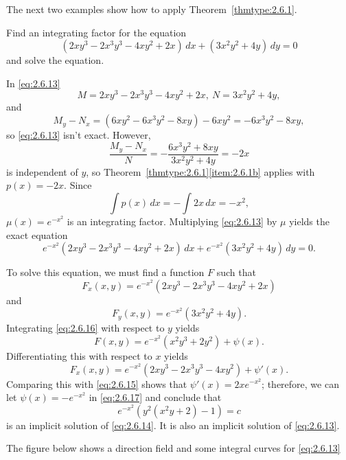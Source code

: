 \documentclass{ximera}
\begin{document}
The next two examples show how to apply
Theorem~\ref{thmtype:2.6.1}.

\begin{example}\label{example:2.6.1}
Find an integrating factor for the equation
\begin{equation}\label{eq:2.6.13}
(2xy^3-2x^3y^3-4xy^2+2x)\,dx+(3x^2y^2+4y)\,dy=0
\end{equation}
and solve the equation.
\begin{explanation}
In \eqref{eq:2.6.13}
$$
M=2xy^3-2x^3y^3-4xy^2+2x,\ N=3x^2y^2+4y,
$$
and
$$
M_y-N_x=(6xy^2-6x^3y^2-8xy)-6xy^2=-6x^3y^2-8xy,
$$
so \eqref{eq:2.6.13}  isn't  exact. However,
$$
\frac{M_y-N_x}{N}=-\frac{6x^3y^2+8xy}{3x^2y^2+4y}=-2x
$$
is independent of $y$, so Theorem~\ref{thmtype:2.6.1}\ref{item:2.6.1b} applies
with
$p(x)=-2x$. Since
$$
\int p (x)\,dx=-\int 2x\,dx=-x^2,
$$
 $\mu(x)=e^{-x^2}$ is an
integrating factor.  Multiplying \eqref{eq:2.6.13} by $\mu$ yields the
exact equation
\begin{equation}\label{eq:2.6.14}
e^{-x^2}(2xy^3-2x^3y^3-4xy^2+2x)\,dx+
 e^{-x^2}(3x^2y^2+4y)\,dy=0.
\end{equation}

To solve this equation, we must find a
function $F$ such that
\begin{equation}\label{eq:2.6.15}
F_x(x,y)=e^{-x^2}(2xy^3-2x^3y^3-4xy^2+2x)
\end{equation}
 and
\begin{equation}\label{eq:2.6.16}
F_y(x,y)=e^{-x^2}(3x^2y^2+4y).
\end{equation}
 Integrating \eqref{eq:2.6.16} with respect to $y$ yields
\begin{equation}\label{eq:2.6.17}
F(x,y)=e^{-x^2}(x^2y^3+2y^2)+\psi(x).
\end{equation}
 Differentiating this with respect to $x$ yields
$$
F_x(x,y)=e^{-x^2}(2xy^3-2x^3y^3-4xy^2)+\psi'(x).
$$
Comparing this with \eqref{eq:2.6.15} shows that $\psi'(x)=
2xe^{-x^2}$;  therefore, we can let $\psi(x)=-e^{-x^2}$ in
\eqref{eq:2.6.17} and conclude that
$$
e^{-x^2}\left(y^2(x^2y+2)-1\right)=c
$$
is an implicit solution of \eqref{eq:2.6.14}. It is also an implicit solution
of \eqref{eq:2.6.13}.

The figure below  shows a  direction field and some integral curves
for \eqref{eq:2.6.13}

\begin{center}
\end{center}


\end{explanation}
\end{example}
\end{document}
